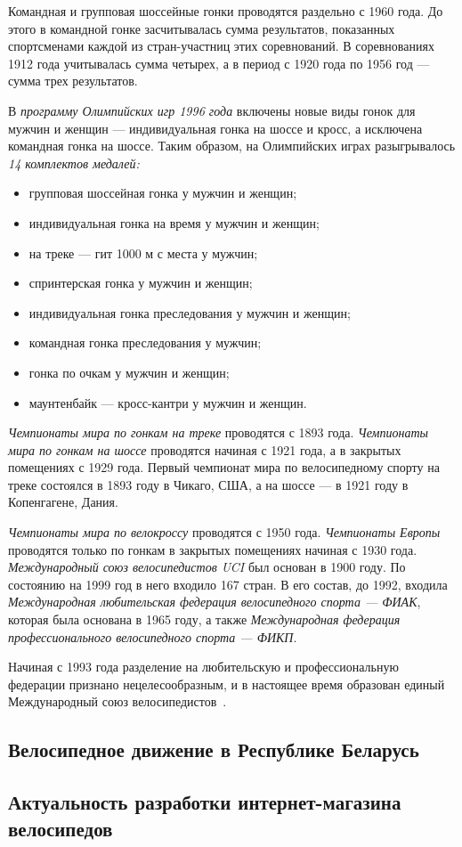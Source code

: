 Командная и групповая шоссейные гонки проводятся раздельно с 1960 года.
До этого в командной гонке засчитывалась сумма результатов, показанных спортсменами
каждой из стран-участниц этих соревнований. В соревнованиях 1912 года учитывалась
сумма четырех, а в период с 1920 года по 1956 год --- сумма трех результатов.

В \textit{программу Олимпийских игр 1996 года} включены новые виды гонок для мужчин и женщин ---
индивидуальная гонка на шоссе и кросс, а исключена командная гонка на шоссе.
Таким образом, на Олимпийских играх разыгрывалось \textit{14 комплектов медалей:}
\begin{itemize}
  \item групповая шоссейная гонка у мужчин и женщин;
  \item индивидуальная гонка на время у мужчин и женщин;
  \item на треке --- гит 1000 м с места у мужчин;
  \item спринтерская гонка у мужчин и женщин;
  \item индивидуальная гонка преследования у мужчин и женщин;
  \item командная гонка преследования у мужчин;
  \item гонка по очкам у мужчин и женщин;
  \item маунтенбайк --- кросс-кантри у мужчин и женщин.
\end{itemize}

\textit{Чемпионаты мира по гонкам на треке} проводятся с 1893 года.
\textit{Чемпионаты мира по гонкам на шоссе} проводятся начиная с 1921 года,
а в закрытых помещениях с 1929 года.
Первый чемпионат мира по велосипедному спорту на треке состоялся в 1893 году в Чикаго,
США, а на шоссе --- в 1921 году в Копенгагене, Дания.

\textit{Чемпионаты мира по велокроссу} проводятся с 1950 года.
\textit{Чемпионаты Европы} проводятся только по гонкам в закрытых помещениях
начиная с 1930 года.
\textit{Международный союз велосипедистов UCI} был основан в 1900 году.
По состоянию на 1999 год в него входило 167 стран. В его состав, до 1992, входила
\textit{Международная любительская федерация велосипедного спорта --- ФИАК},
которая была основана в 1965 году, а также \textit{Международная федерация
профессионального велосипедного спорта --- ФИКП}.

Начиная с 1993 года разделение на любительскую и профессиональную федерации
признано нецелесообразным, и в настоящее время образован единый Международный
союз велосипедистов~\cite{bicycle_sport_history}.

\subsection{Велосипедное движение в Республике Беларусь}

\subsection{Актуальность разработки интернет-магазина \\ велосипедов}

\pagebreak

